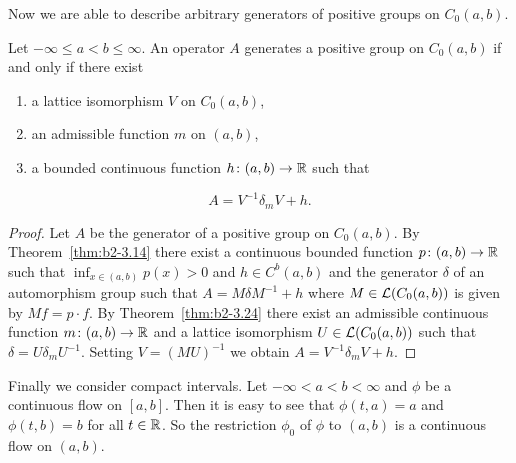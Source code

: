Now we are able to describe arbitrary generators of positive groups on $C_{0}(a,b)$.
\begin{theorem}\label{thm:b2-3.25}
%
Let $-\infty \leq a < b \leq \infty$.
An operator $A$ generates a positive group on $C_{0}(a,b)$ if and only if there exist
\begin{enumerate}[\upshape (i)]
\item 
a lattice isomorphism $V$ on $C_{0}(a,b)$,
\item 
an admissible function $m$ on $(a,b)$,
\item 
a bounded continuous function $h \colon (a,b) \to \mathbb{R}$ such that
\end{enumerate}
\begin{equation}\label{eq:b2-3.24}
A = V^{-1}\delta_{m}V + h.
\end{equation}
\end{theorem}
\begin{proof}
Let $A$ be the generator of a positive group on $C_{0}(a,b)$.
By Theorem~\ref{thm:b2-3.14} 
there exist a continuous bounded function $p \colon (a,b) \to \mathbb{R}$ such that $\inf_{x \in (a,b)} p(x) > 0$ and $h \in C^{b}(a,b)$ 
and the generator $\delta$ of an automorphism group such that $A = M\delta M^{-1} + h$ 
where $M \in \mathcal{L}(C_{0}(a,b))$ is given by $Mf = p \cdot f$.
By Theorem~\ref{thm:b2-3.24} there exist an admissible continuous function $m \colon (a,b) \to \mathbb{R}$ and a lattice isomorphism $U \in \mathcal{L}(C_{0}(a,b))$ such that $\delta = U\delta_{m}U^{-1}$.
Setting $V = (MU)^{-1}$ we obtain $A = V^{-1}\delta_{m}V + h$.
\end{proof}
Finally we consider compact intervals.
Let $-\infty < a < b < \infty$ and $\phi$ be a continuous flow on $[a,b]$.
Then it is easy to see that $\phi(t,a) = a$ and $\phi(t,b) = b$ for all $t \in \mathbb{R}$.
So the restriction $\phi_{0}$ of\/ $\phi$ to $(a,b)$ is a continuous flow on $(a,b)$.

